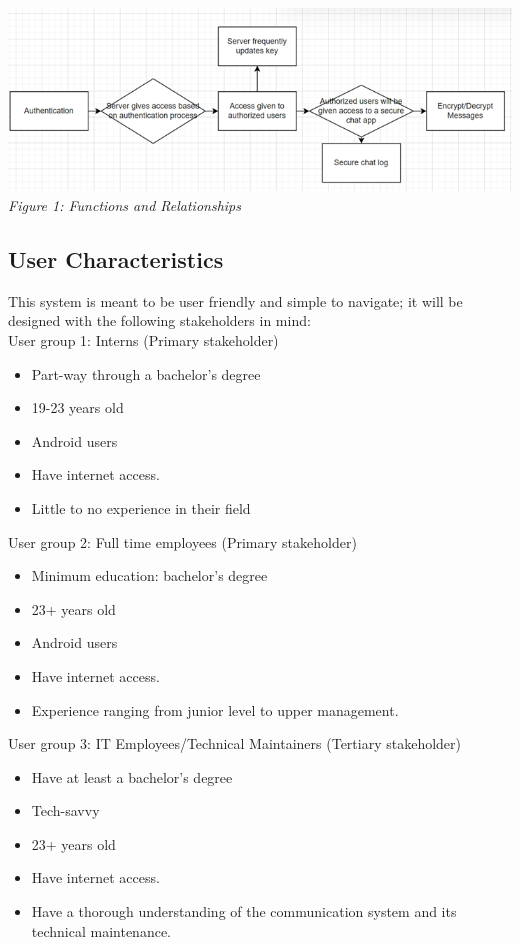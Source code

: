 \documentclass[]{article}
\begin{document}
\begin{center}
    \includegraphics{Graphics/2.2diagram.png}\\
    \emph{Figure 1: Functions and Relationships}
\end{center}


\subsection{User Characteristics}
\label{sub:user_characteristics}
This system is meant to be user friendly and simple to navigate; it will be designed with the following stakeholders in mind:\\
User group 1: Interns (Primary stakeholder)
\begin{itemize}
    \item Part-way through a bachelor’s degree
    \item 19-23 years old
    \item Android users
    \item Have internet access.
    \item Little to no experience in their field
\end{itemize}

\noindent User group 2: Full time employees (Primary stakeholder)
\begin{itemize}
    \item Minimum education: bachelor’s degree
    \item 23+ years old
    \item Android users
    \item Have internet access.
    \item Experience ranging from junior level to upper management.
\end{itemize}

\noindent User group 3: IT Employees/Technical Maintainers (Tertiary stakeholder)
\begin{itemize}
    \item Have at least a bachelor’s degree
    \item Tech-savvy
    \item 23+ years old
    \item Have internet access.
    \item Have a thorough understanding of the communication system and its technical maintenance.
\end{itemize}
\end{document}
